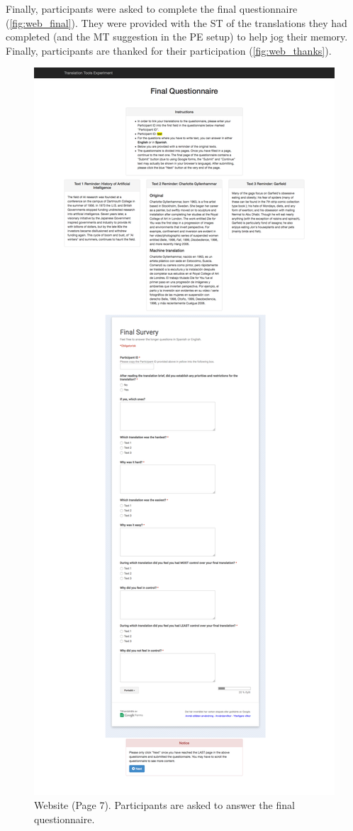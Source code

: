 Finally, participants were asked to complete the final questionnaire (\autoref{fig:web_final}). They were provided with the \ac{ST} of the translations they had completed (and the \ac{MT} suggestion in the \ac{PE} setup) to help jog their memory. Finally, participants are thanked for their participation (\autoref{fig:web_thanks}).

\begin{figure}[h]
\myfloatalign
\includegraphics[height=\textheight]{img/web/web_7.png}
\caption{Website (Page 7). Participants are asked to answer the final questionnaire.}
\label{fig:web_final}
\end{figure}

